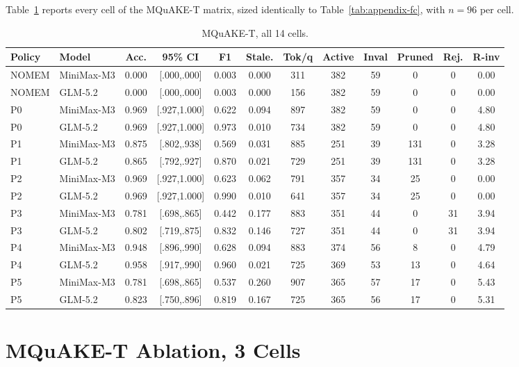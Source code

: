 Table~\ref{tab:appendix-mq} reports every cell of the MQuAKE-T matrix, sized identically to Table~\ref{tab:appendix-fc}, with $n = 96$ per cell.

\begin{table}[H]
\centering
\caption{MQuAKE-T, all 14 cells.}
\label{tab:appendix-mq}
\tiny
\setlength{\tabcolsep}{2.6pt}
\begin{tabular}{llcccccccccc}
\toprule
Policy & Model & Acc. & 95\% CI & F1 & Stale. & Tok/q & Active & Inval & Pruned & Rej. & R-inv \\
\midrule
NOMEM & MiniMax-M3 & 0.000 & [.000,.000] & 0.003 & 0.000 & 311 & 382 & 59 & 0 & 0 & 0.00 \\
NOMEM & GLM-5.2 & 0.000 & [.000,.000] & 0.003 & 0.000 & 156 & 382 & 59 & 0 & 0 & 0.00 \\
P0 & MiniMax-M3 & 0.969 & [.927,1.000] & 0.622 & 0.094 & 897 & 382 & 59 & 0 & 0 & 4.80 \\
P0 & GLM-5.2 & 0.969 & [.927,1.000] & 0.973 & 0.010 & 734 & 382 & 59 & 0 & 0 & 4.80 \\
P1 & MiniMax-M3 & 0.875 & [.802,.938] & 0.569 & 0.031 & 885 & 251 & 39 & 131 & 0 & 3.28 \\
P1 & GLM-5.2 & 0.865 & [.792,.927] & 0.870 & 0.021 & 729 & 251 & 39 & 131 & 0 & 3.28 \\
P2 & MiniMax-M3 & 0.969 & [.927,1.000] & 0.623 & 0.062 & 791 & 357 & 34 & 25 & 0 & 0.00 \\
P2 & GLM-5.2 & 0.969 & [.927,1.000] & 0.990 & 0.010 & 641 & 357 & 34 & 25 & 0 & 0.00 \\
P3 & MiniMax-M3 & 0.781 & [.698,.865] & 0.442 & 0.177 & 883 & 351 & 44 & 0 & 31 & 3.94 \\
P3 & GLM-5.2 & 0.802 & [.719,.875] & 0.832 & 0.146 & 727 & 351 & 44 & 0 & 31 & 3.94 \\
P4 & MiniMax-M3 & 0.948 & [.896,.990] & 0.628 & 0.094 & 883 & 374 & 56 & 8 & 0 & 4.79 \\
P4 & GLM-5.2 & 0.958 & [.917,.990] & 0.960 & 0.021 & 725 & 369 & 53 & 13 & 0 & 4.64 \\
P5 & MiniMax-M3 & 0.781 & [.698,.865] & 0.537 & 0.260 & 907 & 365 & 57 & 17 & 0 & 5.43 \\
P5 & GLM-5.2 & 0.823 & [.750,.896] & 0.819 & 0.167 & 725 & 365 & 56 & 17 & 0 & 5.31 \\
\bottomrule
\end{tabular}
\end{table}

\section{MQuAKE-T Ablation, 3 Cells}
\label{sec:appendix-ablation}

